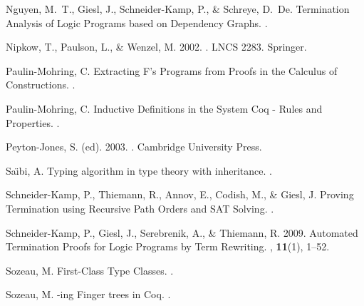 \begin{thebibliography}{}
Nguyen, M.~T., Giesl, J., Schneider-Kamp, P., \& Schreye, D.~De.
\newblock Termination Analysis of Logic Programs based on Dependency Graphs.
.

Nipkow, T., Paulson, L., \& Wenzel, M. 2002.
.
\newblock LNCS 2283.
\newblock Springer.


Paulin-Mohring, C.
\newblock Extracting {F}'s Programs from Proofs in the Calculus of
  Constructions.
.

Paulin-Mohring, C.
\newblock Inductive Definitions in the System {Coq} - Rules and Properties.
.

Peyton-Jones, S. (ed). 2003.
.
\newblock Cambridge University Press.

Sa{\"\i}bi, A.
\newblock Typing algorithm in type theory with inheritance.
.

Schneider-Kamp, P., Thiemann, R., Annov, E., Codish, M., \& Giesl, J.
\newblock Proving Termination using Recursive Path Orders and {SAT} Solving.
.

Schneider-Kamp, P., Giesl, J., Serebrenik, A., \& Thiemann, R. 2009.
\newblock Automated Termination Proofs for Logic Programs by Term Rewriting.
, {\bf 11}(1), 1--52.

Sozeau, M.
\newblock First-Class Type Classes.
.

Sozeau, M.
-ing Finger trees in {Coq}.
.


\end{thebibliography}
